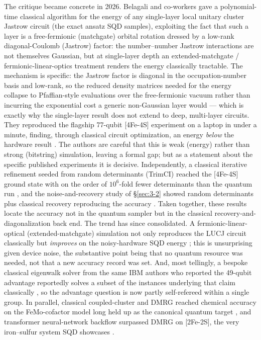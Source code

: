 \documentclass[11pt]{article}
\begin{document}
The critique became concrete in 2026. Belagali and co-workers gave a polynomial-time classical algorithm for the energy of any single-layer local unitary cluster Jastrow circuit (the exact ansatz SQD samples), exploiting the fact that such a layer is a free-fermionic (matchgate) orbital rotation dressed by a low-rank diagonal-Coulomb (Jastrow) factor: the number--number Jastrow interactions are not themselves Gaussian, but at single-layer depth an extended-matchgate / fermionic-linear-optics treatment renders the energy classically tractable. The mechanism is specific: the Jastrow factor is diagonal in the occupation-number basis and low-rank, so the reduced density matrices needed for the energy collapse to Pfaffian-style evaluations over the free-fermionic vacuum rather than incurring the exponential cost a generic non-Gaussian layer would --- which is exactly why the single-layer result does not extend to deep, multi-layer circuits. They reproduced the flagship 77-qubit [4Fe-4S] experiment on a laptop in under a minute, finding, through classical circuit optimization, an energy \emph{below} the hardware result \cite{belagali2026}. The authors are careful that this is weak (energy) rather than strong (bitstring) simulation, leaving a formal gap; but as a statement about the specific published experiments it is decisive. Independently, a classical iterative refinement seeded from random determinants (TrimCI) reached the [4Fe-4S] ground state with on the order of $10^6$-fold fewer determinants than the quantum run \cite{zhangotten2025}, and the noise-and-recovery study of \S\ref{sec:3-2} showed random determinants plus classical recovery reproducing the accuracy \cite{vaquerosabater2026}. Taken together, these results locate the accuracy not in the quantum sampler but in the classical recovery-and-diagonalization back end. The trend has since consolidated. A fermionic-linear-optical (extended-matchgate) simulation not only reproduces the LUCJ circuit classically but \emph{improves} on the noisy-hardware SQD energy \cite{hassman2025}; this is unsurprising given device noise, the substantive point being that no quantum resource was needed, not that a new accuracy record was set. And, most tellingly, a bespoke classical eigenwalk solver from the same IBM authors who reported the 49-qubit advantage reportedly solves a subset of the instances underlying that claim classically \cite{chin2026}, so the advantage question is now partly self-refereed within a single group. In parallel, classical coupled-cluster and DMRG reached chemical accuracy on the FeMo-cofactor model long held up as the canonical quantum target \cite{zhai2026}, and transformer neural-network backflow surpassed DMRG on [2Fe-2S], the very iron--sulfur system SQD showcases \cite{ma2025}.
\end{document}
